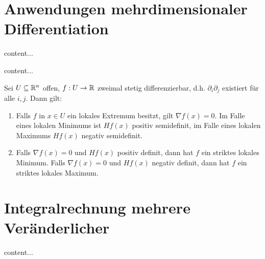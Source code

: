 \pagebreak

\section{Anwendungen mehrdimensionaler Differentiation}

\begin{satz}[Mittelwertsatz]
	content...
\end{satz}

\begin{satz}
	content...
\end{satz}

\begin{satz}
	Sei $U \subseteq \mathbb{R}^n$ offen, $f : U \rightarrow \mathbb{R}$ zweimal stetig differenzierbar, d.h. $\partial_i \partial_j$ existiert für alle $i, j$. Dann gilt:
	\begin{enumerate}[noitemsep]
		\item Falls $f$ in $x \in U$ ein lokales Extremum besitzt, gilt $\nabla f(x) = 0$. Im Falle eines lokalen Minimums ist $Hf(x)$ positiv semidefinit, im Falle eines lokalen Maximums $Hf(x)$ negativ semidefinit.
		\item Falls $\nabla f(x) = 0$ und $Hf(x)$ positiv definit, dann hat $f$ ein striktes lokales Minimum. Falls $\nabla f(x) = 0$ und $Hf(x)$ negativ definit, dann hat $f$ ein striktes lokales Maximum. 
	\end{enumerate}
\end{satz}





\pagebreak
	
\section{Integralrechnung mehrere Veränderlicher}

\begin{definition}
	content...
\end{definition}

